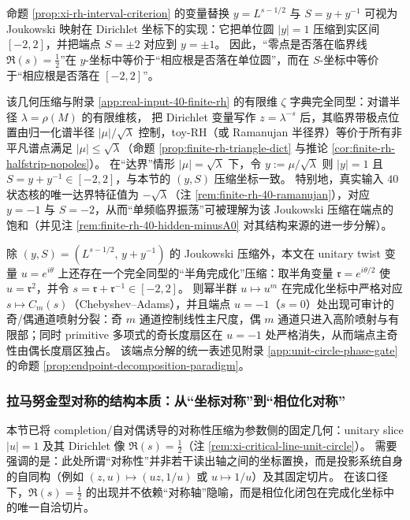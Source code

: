 \begin{remark}\label{rem:xi-joukowski-toy-rh-alignment}
命题 \ref{prop:xi-rh-interval-criterion} 的变量替换
\(
y=L^{s-1/2}
\)
与
\(
S=y+y^{-1}
\)
可视为 Joukowski 映射在 Dirichlet 坐标下的实现：它把单位圆 \(|y|=1\) 压缩到实区间 \([-2,2]\)，并把端点
\(
S=\pm 2
\)
对应到
\(
y=\pm 1
\)。
因此，“零点是否落在临界线 \(\Re(s)=\tfrac12\)”在 \(y\)-坐标中等价于“相应根是否落在单位圆”，而在 \(S\)-坐标中等价于“相应根是否落在 \([-2,2]\)”。
\par
该几何压缩与附录 \ref{app:real-input-40-finite-rh} 的有限维 \(\zeta\) 字典完全同型：对谱半径 \(\lambda=\rho(M)\) 的有限维核，
把 Dirichlet 变量写作 \(z=\lambda^{-s}\) 后，其临界带极点位置由归一化谱半径
\(
|\mu|/\sqrt{\lambda}
\)
控制，toy-RH（或 Ramanujan 半径界）等价于所有非平凡谱点满足 \(|\mu|\le \sqrt{\lambda}\)（命题 \ref{prop:finite-rh-triangle-dict} 与推论 \ref{cor:finite-rh-halfstrip-nopoles}）。
在“达界”情形 \(|\mu|=\sqrt{\lambda}\) 下，令
\(
y:=\mu/\sqrt{\lambda}
\)
则 \(|y|=1\) 且 \(S=y+y^{-1}\in[-2,2]\)，与本节的 \((y,S)\) 压缩坐标一致。
特别地，真实输入 \(40\) 状态核的唯一达界特征值为 \(-\sqrt{\lambda}\)（注 \ref{rem:finite-rh-40-ramanujan}），对应 \(y=-1\) 与 \(S=-2\)，从而“单频临界振荡”可被理解为该 Joukowski 压缩在端点的饱和（并见注 \ref{rem:finite-rh-40-hidden-minusA0} 对其结构来源的进一步分解）。
\end{remark}

\begin{remark}\label{rem:xi-half-angle-endpoint-paradigm}
除 \((y,S)=(L^{s-1/2},\,y+y^{-1})\) 的 Joukowski 压缩外，本文在 unitary twist 变量 \(u=e^{i\theta}\) 上还存在一个完全同型的“半角完成化”压缩：取半角变量 \(\mathfrak{r}=e^{i\theta/2}\) 使 \(u=\mathfrak{r}^2\)，并令 \(s=\mathfrak{r}+\mathfrak{r}^{-1}\in[-2,2]\)。
则幂半群 \(u\mapsto u^m\) 在完成化坐标中严格对应 \(s\mapsto C_m(s)\)（Chebyshev--Adams），并且端点 \(u=-1\)（\(s=0\)）处出现可审计的奇/偶通道喷射分裂：奇 \(m\) 通道控制线性主尺度，偶 \(m\) 通道只进入高阶喷射与有限部；同时 primitive 多项式的奇长度扇区在 \(u=-1\) 处严格消失，从而端点主奇性由偶长度扇区独占。
该端点分解的统一表述见附录 \ref{app:unit-circle-phase-gate} 的命题 \ref{prop:endpoint-decomposition-paradigm}。
\end{remark}

\subsubsection{拉马努金型对称的结构本质：从“坐标对称”到“相位化对称”}\label{subsubsec:ramanujan-phase-lift-symmetry}
本节已将 completion/自对偶诱导的对称性压缩为参数侧的固定几何：unitary slice \(|u|=1\) 及其 Dirichlet 像 \(\Re(s)=\tfrac12\)（注 \ref{rem:xi-critical-line-unit-circle}）。
需要强调的是：此处所谓“对称性”并非若干读出轴之间的坐标置换，而是投影系统自身的自同构（例如 \((z,u)\mapsto(uz,1/u)\) 或 \(u\mapsto 1/u\)）及其固定切片。
在该口径下，\(\Re(s)=\tfrac12\) 的出现并不依赖“对称轴”隐喻，而是相位化闭包在完成化坐标中的唯一自洽切片。

